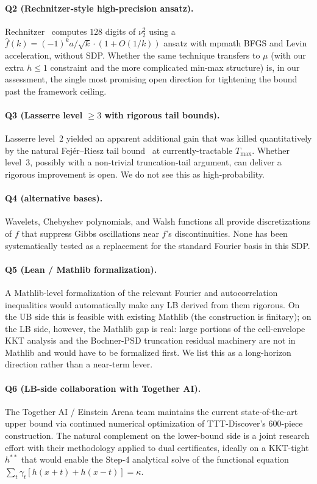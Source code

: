 \documentclass[11pt]{article}
\theoremstyle{plain}
\theoremstyle{definition}
\begin{document}
\paragraph{Q2 (Rechnitzer-style high-precision ansatz).}
Rechnitzer~\cite{Rechnitzer2026} computes $128$ digits of $\nu_2^2$
using a $\hat f(k) = (-1)^k a/\sqrt k \cdot (1 + O(1/k))$ ansatz with
mpmath BFGS and Levin acceleration, without SDP. Whether the same
technique transfers to $\mu$ (with our extra $h \le 1$ constraint and
the more complicated min-max structure) is, in our assessment, the
single most promising open direction for tightening the bound past the
framework ceiling.

\paragraph{Q3 (Lasserre level $\ge 3$ with rigorous tail bounds).}
Lasserre level~2 yielded an apparent additional gain that was killed
quantitatively by the natural Fej\'er--Riesz tail
bound~\cite{LasserreTail} at currently-tractable $T_{\max}$. Whether
level~3, possibly with a non-trivial truncation-tail argument, can
deliver a rigorous improvement is open. We do not see this as
high-probability.

\paragraph{Q4 (alternative bases).}
Wavelets, Chebyshev polynomials, and Walsh functions all provide
discretizations of $f$ that suppress Gibbs oscillations near $f$'s
discontinuities. None has been systematically tested as a replacement
for the standard Fourier basis in this SDP.

\paragraph{Q5 (Lean / Mathlib formalization).}
A Mathlib-level formalization of the relevant Fourier and
autocorrelation inequalities would automatically make any LB derived
from them rigorous. On the UB side this is feasible with existing
Mathlib (the construction is finitary); on the LB side, however, the
Mathlib gap is real: large portions of the cell-envelope KKT analysis
and the Bochner-PSD truncation residual machinery are not in Mathlib
and would have to be formalized first. We list this as a long-horizon
direction rather than a near-term lever.

\paragraph{Q6 (LB-side collaboration with Together AI).}
The Together AI / Einstein Arena team
\cite{TogetherComputer2026, TTTDiscover2026} maintains the current
state-of-the-art upper bound via continued numerical optimization of
TTT-Discover's $600$-piece construction. The natural complement on the
lower-bound side is a joint research effort with their methodology
applied to dual certificates, ideally on a KKT-tight $h^{**}$ that
would enable the Step-4 analytical solve of the functional equation
$\sum_t \gamma_t[h(x + t) + h(x - t)] = \kappa$.
\end{document}
